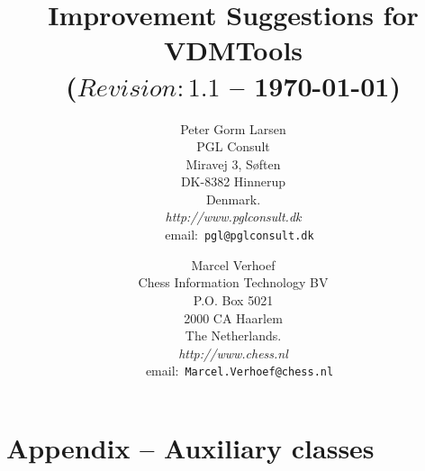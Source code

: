 \documentclass{article}
\makeatletter
\newcommand{\pgldk}
{PGL Consult \\ Miravej 3, S{\o}ften\\
DK-8382 Hinnerup\\ Denmark. \\
\textit{http://www.pglconsult.dk}\\~~email:\,
\texttt{pgl@pglconsult.dk}}
\newcommand{\chessnl}
{Chess Information Technology BV\\ P.O. Box 5021\\
2000 CA Haarlem\\ The Netherlands. \\
\textit{http://www.chess.nl}\\~~email:\,
\texttt{Marcel.Verhoef@chess.nl}}
\makeatother
\begin{document}
\pagestyle{plain}

\title{Improvement Suggestions for VDMTools \\
\small{($Revision: 1.1 $ -- \today)}}
\author{Peter Gorm Larsen\\ \pgldk \and Marcel Verhoef\\\chessnl}
\date{\mbox{}}
\maketitle


\tableofcontents

\newpage



















\nocite{*}




\pagebreak

\section*{Appendix -- Auxiliary classes}




\end{document}
